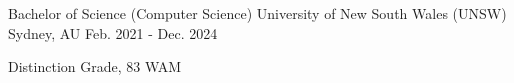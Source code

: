 

\begin{cventries}

  \cventry
    {Bachelor of Science (Computer Science)} %
    {University of New South Wales (UNSW)} %
    {Sydney, AU} %
    {Feb. 2021 - Dec. 2024} %
    {
      \begin{cvitems}
        \item {Distinction Grade, 83 WAM}
      \end{cvitems}
    }

\end{cventries}
